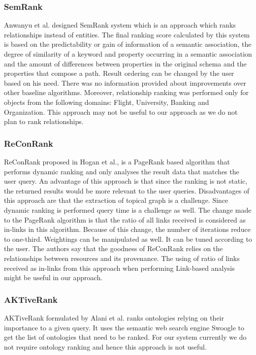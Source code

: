 \documentclass{article}
\begin{document}
    \subsubsection{SemRank}
    Anwanyu et al.\cite{anyanwu05} designed SemRank system which is an approach which ranks relationships instead of entities. The final ranking score calculated by this system is based on the predictability or gain of information of a semantic association, the degree of similarity of a keyword and property occurring in a semantic association and the amount of differences between properties in the original schema and the properties that compose a path. Result ordering can be changed by the user based on his need. There was no information provided about improvements over other baseline algorithms. Moreover, relationship ranking was performed only for objects from the following domains: Flight, University, Banking and Organization. This approach may not be useful to our approach as we do not plan to rank relationships.

    \subsubsection{ReConRank}
    ReConRank proposed in Hogan et al.\cite{hogan06}, is a PageRank based algorithm that performs dynamic ranking and only analyses the result data that matches the user query. An advantage of this approach is that since the ranking is not static, the returned results would be more relevant to the user queries. Disadvantages of this approach are that the extraction of topical graph is a challenge. Since dynamic ranking is performed query time is a challenge as well. The change made to the PageRank algorithm is that the ratio of all links received is considered as in-links in this algorithm. Because of this change, the number of iterations reduce to one-third. Weightings can be manipulated as well. It can be tuned according to the user. The authors say that the goodness of ReConRank relies on the relationships between resources and its provenance. The using of ratio of links received as in-links from this approach when performing Link-based analysis might be useful in our approach.

    \subsubsection{AKTiveRank}
    AKTiveRank formulated by Alani et al.\cite{alani06} ranks ontologies relying on their importance to a given query. It uses the semantic web search engine Swoogle\cite{ding05} to get the list of ontologies that need to be ranked. For our system currently  we do not require ontology ranking and hence this approach is not useful.
\end{document}
